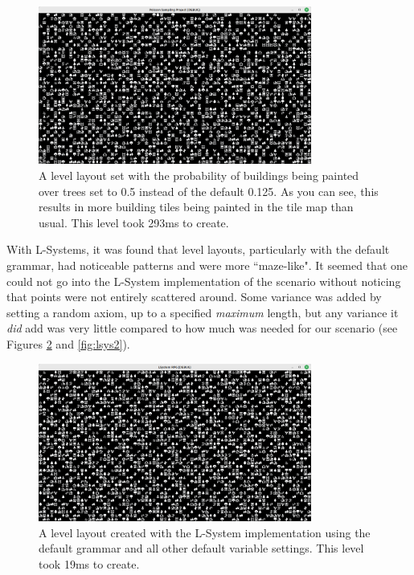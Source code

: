 \begin{figure}[H]
    \centering
    \includegraphics[width=0.8\textwidth]{Images/poisson-buildings-0.5.png}
    \caption{A level layout set with the probability of buildings being painted over trees set to 0.5 instead of the default 0.125. As you can see, this results in more building tiles being painted in the tile map than usual. This level took 293ms to create.}
    \label{fig:poisson5}
\end{figure}

With L-Systems, it was found that level layouts, particularly with the default grammar, had noticeable patterns and were more ``maze-like". It seemed that one could not go into the L-System implementation of the scenario without noticing that points were not entirely scattered around. Some variance was added by setting a random axiom, up to a specified \textit{maximum} length, but any variance it \textit{did} add was very little compared to how much was needed for our scenario (see Figures \ref{fig:lsys1} and \ref{fig:lsys2}).

\begin{figure}[H]
    \centering
    \includegraphics[width=0.8\textwidth]{Images/lsystem1-19ms.png}
    \caption{A level layout created with the L-System implementation using the default grammar and all other default variable settings. This level took 19ms to create.}
    \label{fig:lsys1}
\end{figure}

